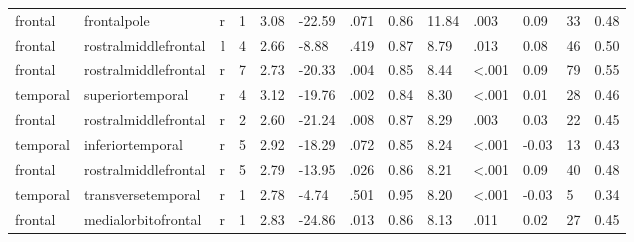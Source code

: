 \documentclass{article}
\begin{document}
\begin{longtable}{llrR{1.3cm}R{1cm}R{1.3cm}R{1cm}R{1cm}R{1.3cm}R{1cm}R{1.8cm}R{1.3cm}R{1.8cm}}
\bottomrule
\endlastfoot
   frontal &               frontalpole &    r &         1 &                  3.08 &           -22.59 &               .071 &                               0.86 &                         11.84 &                            .003 &   0.09 &     33 &      0.48 \\
   frontal &      rostralmiddlefrontal &    l &         4 &                  2.66 &            -8.88 &               .419 &                               0.87 &                          8.79 &                            .013 &   0.08 &     46 &      0.50 \\
   frontal &      rostralmiddlefrontal &    r &         7 &                  2.73 &           -20.33 &               .004 &                               0.85 &                          8.44 &                   \textless.001 &   0.09 &     79 &      0.55 \\
  temporal &          superiortemporal &    r &         4 &                  3.12 &           -19.76 &               .002 &                               0.84 &                          8.30 &                   \textless.001 &   0.01 &     28 &      0.46 \\
   frontal &      rostralmiddlefrontal &    r &         2 &                  2.60 &           -21.24 &               .008 &                               0.87 &                          8.29 &                            .003 &   0.03 &     22 &      0.45 \\
  temporal &          inferiortemporal &    r &         5 &                  2.92 &           -18.29 &               .072 &                               0.85 &                          8.24 &                   \textless.001 &  -0.03 &     13 &      0.43 \\
   frontal &      rostralmiddlefrontal &    r &         5 &                  2.79 &           -13.95 &               .026 &                               0.86 &                          8.21 &                   \textless.001 &   0.09 &     40 &      0.48 \\
  temporal &        transversetemporal &    r &         1 &                  2.78 &            -4.74 &               .501 &                               0.95 &                          8.20 &                   \textless.001 &  -0.03 &      5 &      0.34 \\
   frontal &       medialorbitofrontal &    r &         1 &                  2.83 &           -24.86 &               .013 &                               0.86 &                          8.13 &                            .011 &   0.02 &     27 &      0.45 \\

\end{longtable}
\end{document}
